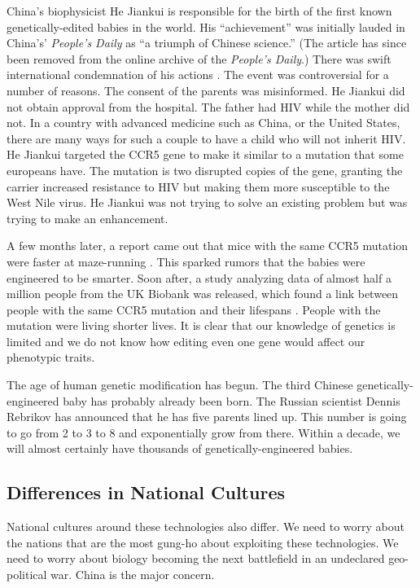 China's biophysicist He Jiankui is responsible for the birth of the first known genetically-edited babies in the world.
His ``achievement'' was initially lauded in China's' \textit{People's Daily} as ``a triumph of Chinese science.''
(The article has since been removed from the online archive of the \textit{People's Daily}.)
There was swift international condemnation of his actions \cite{crisprbabies2018}.
The event was controversial for a number of reasons.
The consent of the parents was misinformed.
He Jiankui did not obtain approval from the hospital.
The father had HIV while the mother did not.
In a country with advanced medicine such as China, or the United States, there are many ways for such a couple to have a child who will not inherit HIV.
He Jiankui targeted the CCR5 gene to make it similar to a mutation that some europeans have.
The mutation is two disrupted copies of the gene, granting the carrier increased resistance to HIV but making them more susceptible to the West Nile virus.
He Jiankui was not trying to solve an existing problem but was trying to make an enhancement.

A few months later, a report came out that mice with the same CCR5 mutation were faster at maze-running \cite{Regalado2019}.
This sparked rumors that the babies were engineered to be smarter.
Soon after, a study analyzing data of almost half a million people from the UK Biobank was released, which found a link between people with the same CCR5 mutation and their lifespans \cite{Wei2019}.
People with the mutation were living shorter lives.
It is clear that our knowledge of genetics is limited and we do not know how editing even one gene would affect our phenotypic traits.

The age of human genetic modification has begun.
The third Chinese genetically-engineered baby has probably already been born.
The Russian scientist Dennis Rebrikov has announced that he has five parents lined up.
This number is going to go from 2 to 3 to 8 and exponentially grow from there.
Within a decade, we will almost certainly have thousands of genetically-engineered babies.

\subsection{Differences in National Cultures}

National cultures around these technologies also differ.
We need to worry about the nations that are the most gung-ho about exploiting these technologies.
We need to worry about biology becoming the next battlefield in an undeclared geo-political war.
China is the major concern.

